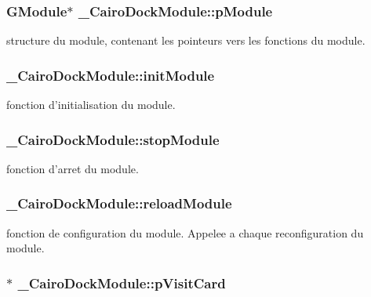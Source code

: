 \subsubsection{\setlength{\rightskip}{0pt plus 5cm}GModule$\ast$ {\bf \_\-CairoDockModule::pModule}}\label{struct__CairoDockModule_89ce3586eab755e1dcf57f8595254212}


structure du module, contenant les pointeurs vers les fonctions du module. 

\subsubsection{ {\bf \_\-CairoDockModule::initModule}}\label{struct__CairoDockModule_bc30bc4b56f135a8da00ca18053e9cfe}


fonction d'initialisation du module. 

\subsubsection{ {\bf \_\-CairoDockModule::stopModule}}\label{struct__CairoDockModule_a099303d9404d1760cd7ae79ba775cb1}


fonction d'arret du module. 

\subsubsection{ {\bf \_\-CairoDockModule::reloadModule}}\label{struct__CairoDockModule_19b9485fcc66509b5cf45a7332d2b15d}


fonction de configuration du module. Appelee a chaque reconfiguration du module. 

\subsubsection{$\ast$ {\bf \_\-CairoDockModule::pVisitCard}}\label{struct__CairoDockModule_ce0364d980c16d785ff585ec57e160a3}


